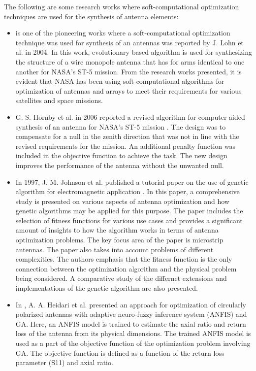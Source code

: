 The following are some research works where soft-computational optimization techniques are used for the synthesis of antenna elements:
\begin{itemize}
\item \cite{cadNASA2} is one of the pioneering works where a soft-computational optimization technique was used for synthesis of an antennas was reported by J. Lohn et al. in 2004. In this work, evolutionary based algorithm is used for synthesizing the structure of a wire monopole antenna that has for arms identical to one another for NASA's ST-5 mission. From the research works presented, it is evident that NASA has been using soft-computational algorithms for optimization of antennas and arrays to meet their requirements for various satellites and space missions.
\item G. S. Hornby et al. in 2006 reported a revised algorithm for computer aided synthesis of an antenna for NASA's ST-5 mission \cite{cadNASA}. The design was to compensate for a null in the zenith direction that was not in line with the revised requirements for the mission. An additional penalty function was included in the objective function to achieve the task. The new design improves the performance of the antenna without the unwanted null.
\item In 1997, J. M. Johnson et al. published a tutorial paper on the use of genetic algorithm for electromagnetic application \cite{ga_em}. In this paper, a comprehensive study is presented on various aspects of antenna optimization and how genetic algorithms may be applied for this purpose. The paper includes the selection of fitness functions for various use cases and provides a significant amount of insights to how the algorithm works in terms of antenna optimization problems. The key focus area of the paper is microstrip antennas. The paper also takes into account problems of different complexities. The authors emphasis that the fitness function is the only connection between the optimization algorithm and the physical problem being considered. A comparative study of the differnet extensions and implementations of the genetic algorithm are also presented.
\item In \cite{circpol_anfis_ga}, A. A. Heidari et al. presented an approach for optimization of circularly polarized antennas with adaptive neuro-fuzzy inference system (ANFIS) and GA. Here, an ANFIS model is trained to estimate the axial ratio and return loss of the antenna from its physical dimensions. The trained ANFIS model is used as a part of the objective function of the optimization problem involving GA. The objective function is defined as a function of the return loss parameter (S11) and axial ratio.

\end{itemize}
